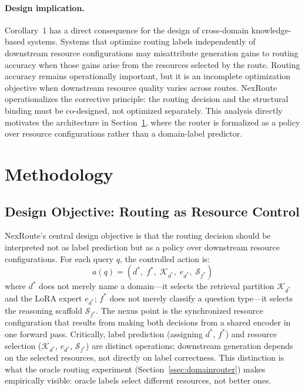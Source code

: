 \documentclass[a4paper,fleql,doubleblind]{cas-sc}
\begin{document}
\paragraph{Design implication.}
Corollary~1 has a direct consequence for the design of cross-domain knowledge-based systems.
Systems that optimize routing labels independently of downstream resource configurations
may misattribute generation gains to routing accuracy when those gains arise from the
resources selected by the route.
Routing accuracy remains operationally important, but it is an incomplete optimization
objective when downstream resource quality varies across routes.
NexRoute operationalizes the corrective principle: the routing decision and the
structural binding must be co-designed, not optimized separately.
This analysis directly motivates the architecture in Section~\ref{sec:method}, where the
router is formalized as a policy over resource configurations rather than a domain-label
predictor.

\section{Methodology}
\label{sec:method}

\subsection{Design Objective: Routing as Resource Control}
\label{ssec:design_objective}

NexRoute's central design objective is that the routing decision should be interpreted
not as label prediction but as a policy over downstream resource configurations.
For each query $q$, the controlled action is:
\begin{equation}
a(q) = \left(d^*,\; f^*,\; \mathcal{K}_{d^*},\; e_{d^*},\; \mathcal{S}_{f^*}\right)
\label{eq:full_action}
\end{equation}
where $d^*$ does not merely name a domain---it selects the retrieval partition
$\mathcal{K}_{d^*}$ and the LoRA expert $e_{d^*}$; $f^*$ does not merely classify
a question type---it selects the reasoning scaffold $\mathcal{S}_{f^*}$.
The nexus point is the synchronized resource configuration that results from making
both decisions from a shared encoder in one forward pass.
Critically, label prediction (assigning $d^*$, $f^*$) and resource selection
($\mathcal{K}_{d^*}$, $e_{d^*}$, $\mathcal{S}_{f^*}$) are distinct operations;
downstream generation depends on the selected resources, not directly on label correctness.
This distinction is what the oracle routing experiment (Section~\ref{ssec:domainrouter})
makes empirically visible: oracle labels select different resources, not better ones.
\end{document}
